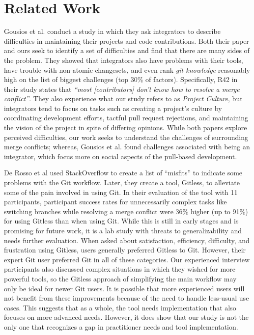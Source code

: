 \section{Related Work}\label{related_work}

Gousios et al. \cite{integrator_perspective} conduct a study in which they ask integrators to describe difficulties in maintaining their projects and code contributions. 
Both their paper and ours seek to identify a set of difficulties and find that there are many sides of the problem. They showed that integrators also have problems with their tools, have trouble with non-atomic changesets, and even rank \textit{git knowledge} reasonably high on the list of biggest challenges (top 30\% of factors). Specifically, R42 in their study states that \textit{``most [contributors] don’t know how to resolve a merge conflict''}. They also experience what our study refers to as \textit{Project Culture}, but integrators tend to focus on tasks such as creating a project's culture by coordinating development efforts, tactful pull request rejections, and maintaining the vision of the project in spite of differing opinions. While both papers explore perceived difficulties, our work seeks to understand the challenges of surrounding merge conflicts; whereas, Gousios et al. found challenges associated with being an integrator, which focus more on social aspects of the pull-based development.

De Rosso et al \cite{DeRosso2016} used StackOverflow to create a list of ``misfits'' to indicate some problems with the Git workflow. Later, they create a tool, Gitless, to alleviate some of the pain involved in using Git. In their evaluation of the tool with 11 participants, participant success rates for unnecessarily complex tasks like  switching branches while resolving a merge conflict were 36\% higher (up to 91\%) for using Gitless than when using Git. While this is still in early stages and is promising for future work, it is a lab study with threats to generalizability and needs further evaluation. 
 When asked about satisfaction, efficiency, difficulty, and frustration using Gitless, users generally preferred Gitless to Git. However, their expert Git user preferred Git in all of these categories. Our experienced interview participants also discussed complex situations in which they wished for more powerful tools, so the Gitless approach of simplifying the main workflow may only be ideal for newer Git users. It is possible that more experienced users will not benefit from these improvements because of the need to handle less-usual use cases. This suggests that as a whole, the tool needs implementation that also focuses on more advanced needs. However, it does show that our study is not the only one that recognizes a gap in practitioner needs and tool implementation.

